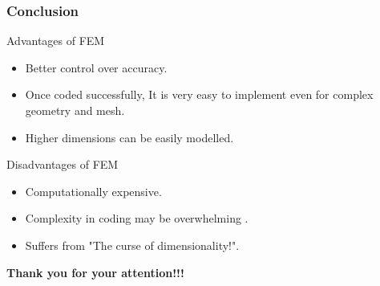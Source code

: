 \documentclass[9pt]{beamer}
\begin{document}
\begin{frame}
\frametitle{Conclusion}
\begin{block}{Advantages of FEM}
\begin{itemize}
\item Better control over accuracy.
\item Once coded successfully, It is very easy to implement even for complex geometry and mesh.
\item Higher dimensions can be easily modelled.
\end{itemize}

\end{block}

\begin{block}{Disadvantages of FEM}
\begin{itemize}
\item Computationally expensive.
\item Complexity in coding may be overwhelming .
\item Suffers from "The curse of dimensionality!".

\end{itemize}

\end{block}
\end{frame}

\begin{frame}
\begin{center}
\begin{LARGE}
\textbf{Thank you for your attention!!!}
\end{LARGE}
\end{center}


\end{frame}
\end{document}
